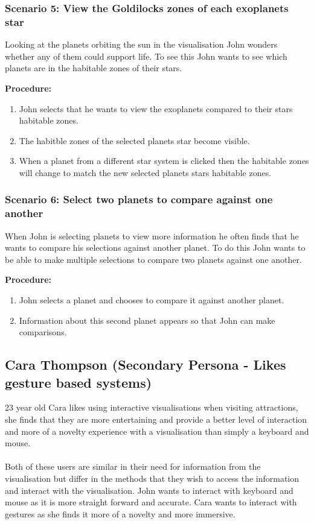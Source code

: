   
 \subsubsection{Scenario 5: View the Goldilocks zones of each exoplanets star}
   Looking at the planets orbiting the sun in the visualisation John wonders
whether any of them could support life. To see this John wants to see which
planets are in the habitable zones of their stars. 
 
  {\bf  Procedure:}
   \begin{enumerate}
 \item John selects that he wants to view the exoplanets compared to their stars
habitable zones.
 \item The habitble zones of the selected planets star become visible.
 \item When a planet from a different star system is clicked then the habitable
zones will change to match the new selected planets stars habitable zones.
 \end{enumerate}
 
  \subsubsection{Scenario 6: Select two planets to compare against one another}
When John is selecting planets to view more information he often finds that he
wants to compare his selections against another planet. To do this John wants to
be able to make multiple selections to compare two planets against one another.
  
  {\bf  Procedure:}
   \begin{enumerate}
 \item John selects a planet and chooses to compare it against another planet.
 \item Information about this second planet appears so that John can make
comparisons.
  \end{enumerate}

\subsection{Cara Thompson (Secondary Persona - Likes gesture based systems)}
23 year old Cara likes using interactive visualisations when visiting
attractions, she finds that they are more entertaining and provide a better
level of interaction and more of a novelty experience with a visualisation than
simply a keyboard and mouse. 
\\\\
Both of these users are similar in their need for information from the
visualisation but differ in the methods that they wish to access the information
and interact with the visualisation. John wants to interact with keyboard and
mouse as it is more straight forward and accurate. Cara wants to interact with
gestures as she finds it more of a novelty and more immersive.

